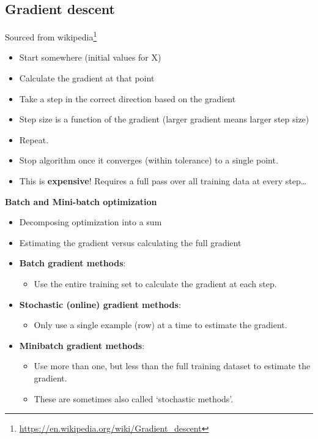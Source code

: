 \documentclass[fontset=fandol,zihao=false,scheme=chinese,heading=true,UTF8]{ctexbook}
\providecommand{\tightlist}{%
  \setlength{\itemsep}{0pt}\setlength{\parskip}{0pt}}
\renewcommand{\href}[2]{#2\footnote{\url{#1}}}
\begin{document}
\hypertarget{gradient-descent}{%
\subsection{Gradient descent}\label{gradient-descent}}

\href{https://en.wikipedia.org/wiki/Gradient_descent}{Sourced from wikipedia}

\begin{itemize}
\tightlist
\item
  Start somewhere (initial values for X)
\item
  Calculate the gradient at that point
\item
  Take a step in the correct direction based on the gradient
\item
  Step size is a function of the gradient (larger gradient means larger step size)
\item
  Repeat.
\item
  Stop algorithm once it converges (within tolerance) to a single point.
\item
  This is \textbf{expensive}! Requires a full pass over all training data at every step\ldots{}
\end{itemize}

\textbf{Batch and Mini-batch optimization}

\begin{itemize}
\tightlist
\item
  Decomposing optimization into a sum
\item
  Estimating the gradient versus calculating the full gradient
\item
  \textbf{Batch gradient methods}:

  \begin{itemize}
  \tightlist
  \item
    Use the entire training set to calculate the gradient at each step.
  \end{itemize}
\item
  \textbf{Stochastic (online) gradient methods}:

  \begin{itemize}
  \tightlist
  \item
    Only use a single example (row) at a time to estimate the gradient.
  \end{itemize}
\item
  \textbf{Minibatch gradient methods}:

  \begin{itemize}
  \tightlist
  \item
    Use more than one, but less than the full training dataset to estimate the gradient.
  \item
    These are sometimes also called `stochastic methods'.
  \end{itemize}
\end{itemize}
\end{document}
